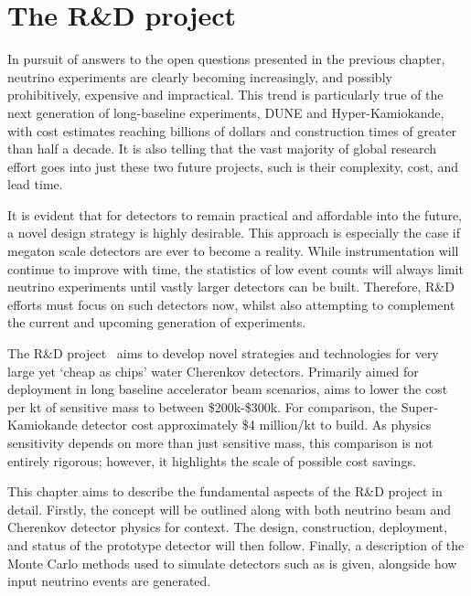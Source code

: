 \chapter{The \chips R\&D project} %
\label{chap:chips}

In pursuit of answers to the open questions presented in the previous chapter, neutrino
experiments are clearly becoming increasingly, and possibly prohibitively, expensive and
impractical. This trend is particularly true of the next generation of long-baseline experiments,
DUNE and Hyper-Kamiokande, with cost estimates reaching billions of dollars and construction times
of greater than half a decade. It is also telling that the vast majority of global research effort
goes into just these two future projects, such is their complexity, cost, and lead time.

It is evident that for detectors to remain practical and affordable into the future, a novel
design strategy is highly desirable. This approach is especially the case if megaton scale
detectors are ever to become a reality. While instrumentation will continue to improve with time,
the statistics of low event counts will always limit neutrino experiments until vastly larger
detectors can be built. Therefore, R\&D efforts must focus on such detectors now, whilst also
attempting to complement the current and upcoming generation of experiments.

The \chips R\&D project~\cite{adamson2013} aims to develop novel strategies and technologies for
very large yet `cheap as chips' water Cherenkov detectors. Primarily aimed for deployment in long
baseline accelerator beam scenarios, \chips aims to lower the cost per kt of sensitive mass to
between \$200k-\$300k. For comparison, the Super-Kamiokande detector cost approximately \$4
million/kt to build. As physics sensitivity depends on more than just sensitive mass, this
comparison is not entirely rigorous; however, it highlights the scale of possible cost savings.

This chapter aims to describe the fundamental aspects of the \chips R\&D project in detail.
Firstly, the \chips concept will be outlined along with both neutrino beam and Cherenkov detector
physics for context. The design, construction, deployment, and status of the \chipsfive prototype
detector will then follow. Finally, a description of the Monte Carlo methods used to simulate
\chips detectors such as \chipsfive is given, alongside how input neutrino events are generated.

